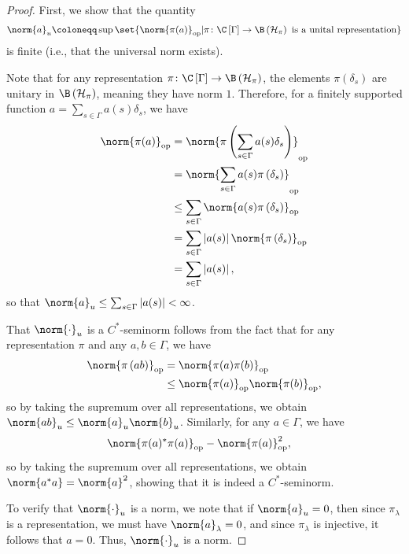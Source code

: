 \begin{proof}
  First, we show that the quantity
  \begin{align*}
    \norm{a}_{u}\coloneq \sup\set{\norm{\pi(a)}_{\op} | \pi\colon \C\left[ \Gamma \right]\rightarrow \B\left( \mathcal{H}_{\pi} \right)\text{ is a unital representation}}
  \end{align*}
  is finite (i.e., that the universal norm exists).\newline

  Note that for any representation $\pi\colon \C\left[ \Gamma \right]\rightarrow \B\left( \mathcal{H}_{\pi} \right)$, the elements $\pi\left( \delta_s \right)$ are unitary in $\B\left( \mathcal{H}_{\pi} \right)$, meaning they have norm $1$. Therefore, for a finitely supported function $a = \sum_{s\in\Gamma}a(s)\delta_s$, we have
  \begin{align*}
    \norm{\pi(a)}_{\op} &= \norm{\pi\left( \sum_{s\in\Gamma}a(s)\delta_s \right)}_{\op}\\
                        &= \norm{\sum_{s\in\Gamma}a(s)\pi\left( \delta_s \right)}_{\op}\\
                        &\leq \sum_{s\in\Gamma}\norm{a(s)\pi\left( \delta_s \right)}_{\op}\\
                        &= \sum_{s\in\Gamma}\left\vert a(s) \right\vert\norm{\pi\left( \delta_s \right)}_{\op}\\
                        &= \sum_{s\in\Gamma}\left\vert a(s) \right\vert,
  \end{align*}
  so that $\norm{a}_u\leq \sum_{s\in\Gamma}\left\vert a(s) \right\vert < \infty$.\newline

  That $\norm{\cdot}_{u}$ is a $C^{\ast}$-seminorm follows from the fact that for any representation $\pi$ and any $a,b\in \Gamma$, we have
  \begin{align*}
    \norm{\pi\left( ab \right)}_{\op} &= \norm{\pi(a)\pi(b)}_{\op}\\
                                      &\leq \norm{\pi(a)}_{\op}\norm{\pi(b)}_{\op},
  \end{align*}
  so by taking the supremum over all representations, we obtain $\norm{ab}_{u}\leq \norm{a}_{u}\norm{b}_{u}$. Similarly, for any $a\in\Gamma$, we have
  \begin{align*}
    \norm{\pi(a)^{\ast}\pi(a)}_{\op} &- \norm{\pi(a)}_{\op}^2,
  \end{align*}
  so by taking the supremum over all representations, we obtain $\norm{a^{\ast}a} = \norm{a}^2$, showing that it is indeed a $C^{\ast}$-seminorm.\newline

  To verify that $\norm{\cdot}_u$ is a norm, we note that if $\norm{a}_{u} = 0$, then since $\pi_{\lambda}$ is a representation, we must have $\norm{a}_{\lambda} = 0$, and since $\pi_{\lambda}$ is injective, it follows that $a = 0$. Thus, $\norm{\cdot}_u$ is a norm.
\end{proof}
